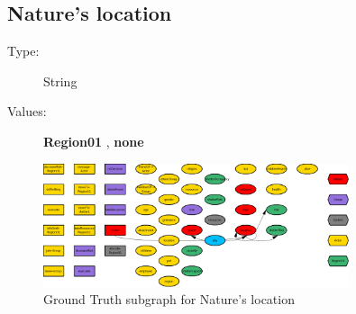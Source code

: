 \documentclass{article}%
\begin{document}
%
\subsection{Nature's location}%
\label{subsec:Nature's location}%
\begin{description}%
\item[Type:]%
String%
\item[Values:]%
\textbf{Region01}%
, %
\textbf{none}%
\end{description}%


\begin{figure}[ht]%
\centering%
\includegraphics[width=0.8\textwidth]{images/locationOfNature.png}%
\caption{Ground Truth subgraph for Nature's location}%
\end{figure}

%
\end{document}
